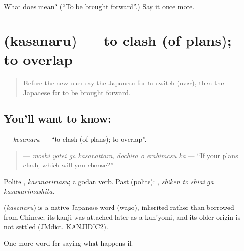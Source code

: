 \begin{tcolorbox}[breakable,colback=teal!4,colframe=teal!35!black,title={Before you move on}]
What does  mean? (\textquotedblleft{}To be brought forward\textquotedblright{}.) Say it once more.
\end{tcolorbox}
\section[\texorpdfstring{\ja{かさなる} (kasanaru)}{かさなる (kasanaru)}]{ (kasanaru) — to clash (of plans); to overlap}

\label{lesson:JA-C512-kasanaru}



\begin{quote}
Before the new one: say the Japanese for to switch (over), then the Japanese for to be brought forward.
\end{quote}

\subsection*{You'll want to know: }
\textbf{} — \emph{kasanaru} — \textquotedblleft{}to clash (of plans); to overlap\textquotedblright{}.

\begin{quote}
\textbf{   } — \emph{moshi yotei ga kasanattara, dochira o erabimasu ka} — \textquotedblleft{}If your plans clash, which will you choose?\textquotedblright{}
\end{quote}

Polite \textbf{}, \emph{kasanarimasu}; a godan verb. Past (polite): \textbf{  }, \emph{shiken to shiai ga kasanarimashita}.

\begin{cousinweb}
\textbf{} (\emph{kasanaru}) is a native Japanese word (wago), inherited rather than borrowed from Chinese; its kanji was attached later as a kun'yomi, and its older origin is not settled (JMdict, KANJIDIC2).
\end{cousinweb}

\begin{grammarlens}[title={What you've built}]
One more word for saying what happens if.
\end{grammarlens}

